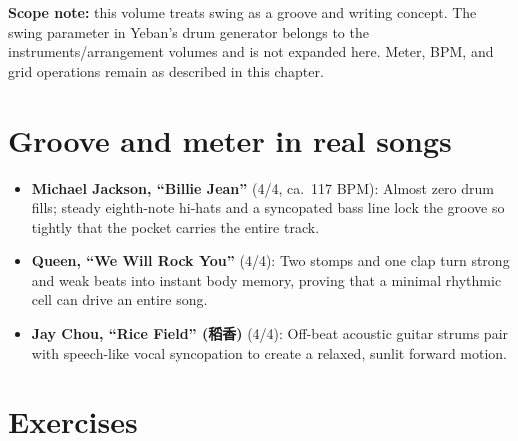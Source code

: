 
\textbf{Scope note:} this volume treats swing as a groove and writing concept. The swing parameter in Yeban's drum generator belongs to the instruments/arrangement volumes and is not expanded here. Meter, BPM, and grid operations remain as described in this chapter.

\section{Groove and meter in real songs}

\begin{itemize}
  \item \textbf{Michael Jackson, ``Billie Jean''} (4/4, ca.\ 117 BPM): Almost zero drum fills; steady eighth-note hi-hats and a syncopated bass line lock the groove so tightly that the pocket carries the entire track.
  \item \textbf{Queen, ``We Will Rock You''} (4/4): Two stomps and one clap turn strong and weak beats into instant body memory, proving that a minimal rhythmic cell can drive an entire song.
  \item \textbf{Jay Chou, ``Rice Field'' (稻香)} (4/4): Off-beat acoustic guitar strums pair with speech-like vocal syncopation to create a relaxed, sunlit forward motion.
\end{itemize}

\section{Exercises}


